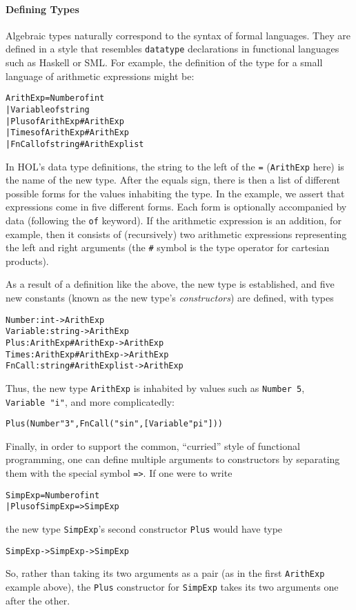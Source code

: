 \documentclass[11pt]{article}
\begin{document}
\paragraph{Defining Types}
Algebraic types naturally correspond to the syntax of formal
languages.  They are defined in a style that resembles
\texttt{datatype} declarations in functional languages such as Haskell
or SML.  For example, the definition of the type for a small language
of arithmetic expressions might be:
\begin{alltt}
   ArithExp = Number of int
            | Variable of string
            | Plus of ArithExp # ArithExp
            | Times of ArithExp # ArithExp
            | FnCall of string # ArithExp list
\end{alltt}
In HOL's data type definitions, the string to the left of the
\texttt{=} (\texttt{ArithExp} here) is the name of the new type.
After the equals sign, there is then a list of different possible
forms for the values inhabiting the type.  In the example, we assert
that expressions come in five different forms.  Each form is
optionally accompanied by data (following the \texttt{of} keyword).
If the arithmetic expression is an addition, for example, then it
consists of (recursively) two arithmetic expressions representing the
left and right arguments (the \texttt{\#} symbol is the type operator
for cartesian products).

As a result of a definition like the above, the new type is
established, and five new constants (known as the new type's
\emph{constructors}) are defined, with types
\begin{alltt}
   Number   : int -> ArithExp
   Variable : string -> ArithExp
   Plus     : ArithExp # ArithExp -> ArithExp
   Times    : ArithExp # ArithExp -> ArithExp
   FnCall   : string # ArithExp list -> ArithExp
\end{alltt}
Thus, the new type \texttt{ArithExp} is inhabited by values such as
\texttt{Number~5}, \texttt{Variable~"i"}, and more complicatedly:
\begin{alltt}
   Plus (Number "3", FnCall ("sin", [Variable "pi"]))
\end{alltt}

\vspace{1ex}
\noindent Finally, in order to support the common, ``curried'' style of
functional programming, one can define multiple arguments to
constructors by separating them with the special symbol
\texttt{=>}. If one were to write
\begin{alltt}
   SimpExp = Number of int
           | Plus of SimpExp => SimpExp
\end{alltt}
the new type \texttt{SimpExp}'s second constructor \texttt{Plus} would
have type
\begin{alltt}
   SimpExp -> SimpExp -> SimpExp
\end{alltt}
So, rather than taking its two arguments as a pair (as in the first
\texttt{ArithExp} example above), the \texttt{Plus} constructor for
\texttt{SimpExp} takes its two arguments one after the other.
\end{document}
